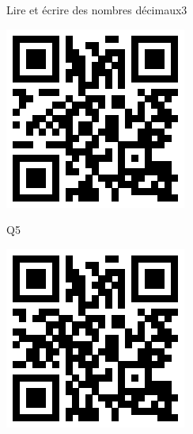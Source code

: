 \documentclass[a4paper,11pt]{report}
\begin{document}
\begin{qmoodle}{Lire et écrire des nombres décimaux}{3}
{\begin{center}
		\includegraphics[scale=1]{img/no2nd/ndlend/ndlend_4}
	\end{center}
	\begin{center}
		Q5

		\includegraphics[scale=1]{img/no2nd/ndlend/ndlend_5}
	\end{center}
}
\end{qmoodle}
\end{document}
